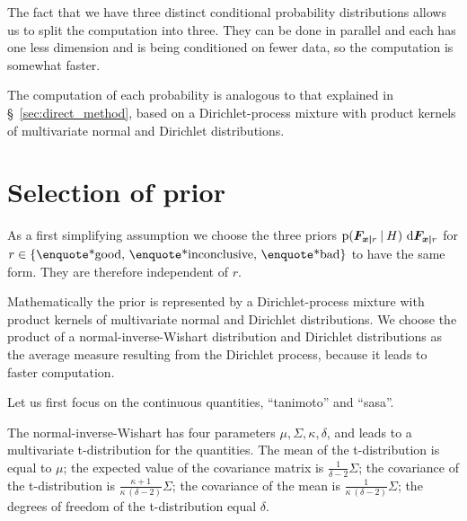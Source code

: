 \documentclass[\ifafour a4paper,12pt,\else a5paper,10pt,\fi%
onecolumn,oneside,article,%
british%
]{memoir}
\theoremstyle{remark}
\theoremstyle{innote}
\newcommand*{\di}{\mathrm{d}}%
\DeclarePairedDelimiter\set{\{}{\}}
\newcommand*{\p}{\mathrm{p}}%
\renewcommand*{\|}[1][]{\nonscript\:#1\vert\nonscript\:\mathopen{}}
\renewcommand*{\=}{\TextOrMath\texteq\eq}
\newcommand*{\sect}{\S}%
\newcommand*{\yF}{\bm{F}}
\begin{document}
The fact that we have three distinct conditional probability distributions
allows us to split the computation into three. They can be done in parallel
and each has one less dimension and is being conditioned on fewer data, so
the computation is somewhat faster.

The computation of each probability is analogous to that explained in
\sect~\ref{sec:direct_method}, based on a Dirichlet-process mixture with
product kernels of multivariate normal and Dirichlet distributions. 




\section{Selection of prior}
\label{sec:sel_prior_reverse}

As a first simplifying assumption we choose the three priors
$\p(\yF_{\bm{x\mid}r} \| H)\ \di\yF_{\bm{x\mid}r}$ for
$r \in \set{\text{\enquote*{good}},\, \text{\enquote*{inconclusive}},\,
  \text{\enquote*{bad}}}$ to have the same form. They are therefore
independent of $r$.

Mathematically the prior is represented by a Dirichlet-process mixture with
product kernels of multivariate normal and Dirichlet distributions. We
choose the product of a normal-inverse-Wishart distribution and Dirichlet
distributions as the average measure resulting from the Dirichlet process,
because it leads to faster computation.

Let us first focus on the continuous quantities, \enquote{tanimoto} and
\enquote{sasa}.

The normal-inverse-Wishart has four parameters
$\mu, \varSigma, \kappa, \delta$, and leads to a multivariate
t-distribution for the quantities. The mean of the t-distribution is equal
to $\mu$; the expected value of the covariance matrix is
$\frac{1}{\delta-2}\varSigma$; the covariance of the t-distribution is
$\frac{\kappa+1}{\kappa\ (\delta-2)}\varSigma$; the covariance of the mean
is $\frac{1}{\kappa\ (\delta-2)}\varSigma$; the degrees of freedom of the
t-distribution equal $\delta$.
\end{document}
